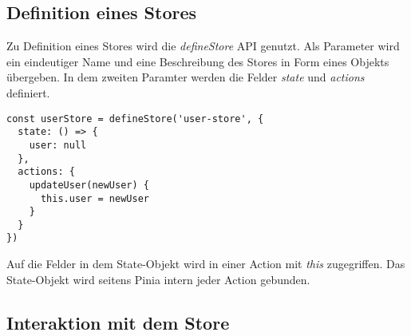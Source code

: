 \subsection{Definition eines Stores}

Zu Definition eines Stores wird die \textit{defineStore} API genutzt. Als Parameter wird ein eindeutiger Name und eine Beschreibung des Stores in Form eines Objekts übergeben. In dem zweiten Paramter werden die Felder \textit{state} und \textit{actions} definiert.

\begin{lstlisting}
const userStore = defineStore('user-store', {
  state: () => {
    user: null
  },
  actions: {
    updateUser(newUser) {
      this.user = newUser
    }
  }
})
\end{lstlisting}

Auf die Felder in dem State-Objekt wird in einer Action mit \textit{this} zugegriffen. Das State-Objekt wird seitens Pinia intern jeder Action gebunden.

\subsection{Interaktion mit dem Store}

